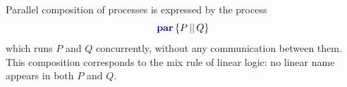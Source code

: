 \documentclass[sigconf,nonacm,natbib=true]{acmart}
\begin{document}
Parallel composition of processes is expressed by the process
$$
    \parc{P}{Q}
$$
which runs $P$ and $Q$ concurrently, without any communication between them. This composition corresponds to the mix rule of linear logic: no linear name appears in both $P$ and $Q$.

\end{document}
